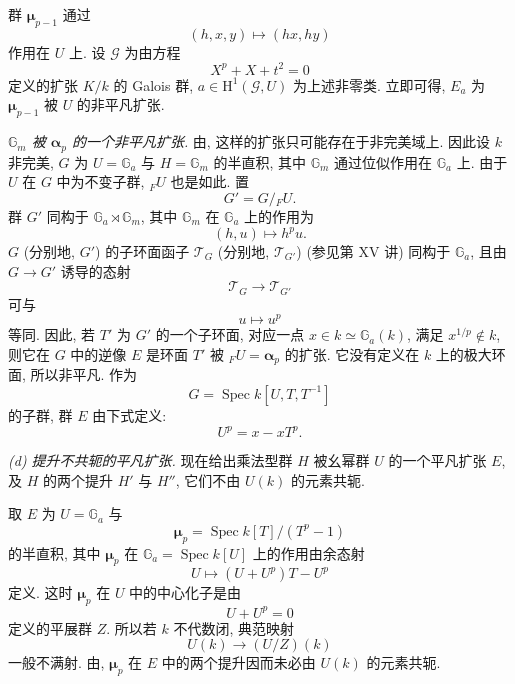 群 \(\boldsymbol\mu_{p-1}\) 通过
\[
  (h,x,y)\longmapsto(hx,hy)
\]
作用在 \(U\) 上. 设 \(\mathscr G\) 为由方程
\[
  X^p+X+t^2=0
\]
定义的扩张 \(K/k\) 的 Galois 群,
\(a\in\mathrm H^1(\mathscr G,U)\) 为上述非零类.
立即可得, \(E_a\) 为 \(\boldsymbol\mu_{p-1}\) 被 \(U\) 的非平凡扩张.

\smallskip
\noindent
\emph{
\(\mathbb G_m\) 被 \(\boldsymbol\alpha_p\) 的一个非平凡扩张.}
由,
这样的扩张只可能存在于非完美域上.
因此设 \(k\) 非完美, \(G\) 为 \(U=\mathbb G_a\) 与 \(H=\mathbb G_m\)
的半直积, 其中 \(\mathbb G_m\) 通过位似作用在 \(\mathbb G_a\) 上.
由于 \(U\) 在 \(G\) 中为不变子群, \({}_{F}U\) 也是如此. 置
\[
  G'=G/{}_{F}U.
\]
群 \(G'\) 同构于 \(\mathbb G_a\rtimes\mathbb G_m\),
其中 \(\mathbb G_m\) 在 \(\mathbb G_a\) 上的作用为
\[
  (h,u)\longmapsto h^p u.
\]
\(G\) (分别地, \(G'\)) 的子环面函子 \(\mathscr T_G\)
(分别地, \(\mathscr T_{G'}\)) (参见第 XV 讲) 同构于 \(\mathbb G_a\),
且由 \(G\longrightarrow G'\) 诱导的态射
\[
  \mathscr T_G\longrightarrow\mathscr T_{G'}
\]
可与
\[
  u\longmapsto u^p
\]
等同. 因此, 若 \(T'\) 为 \(G'\) 的一个子环面,
对应一点 \(x\in k\simeq\mathbb G_a(k)\), 满足 \(x^{1/p}\notin k\),
则它在 \(G\) 中的逆像 \(E\) 是环面 \(T'\) 被 \({}_{F}U=\boldsymbol\alpha_p\) 的扩张.
它没有定义在 \(k\) 上的极大环面, 所以非平凡.
作为
\[
  G=\operatorname{Spec}k[U,T,T^{-1}]
\]
的子群, 群 \(E\) 由下式定义:
\[
  U^p=x-xT^p.
\]


\smallskip
\noindent
\emph{(d) 提升不共轭的平凡扩张.}
现在给出乘法型群 \(H\) 被幺幂群 \(U\) 的一个平凡扩张 \(E\),
及 \(H\) 的两个提升 \(H'\) 与 \(H''\), 它们不由 \(U(k)\) 的元素共轭.

取 \(E\) 为 \(U=\mathbb G_a\) 与
\[
  \boldsymbol\mu_p
  =\operatorname{Spec}k[T]/(T^p-1)
\]
的半直积, 其中 \(\boldsymbol\mu_p\) 在 \(\mathbb G_a=\operatorname{Spec}k[U]\)
上的作用由余态射
\[
  U\longmapsto(U+U^p)T-U^p
\]
定义. 这时 \(\boldsymbol\mu_p\) 在 \(U\) 中的中心化子是由
\[
  U+U^p=0
\]
定义的平展群 \(Z\). 所以若 \(k\) 不代数闭, 典范映射
\[
  U(k)\longrightarrow(U/Z)(k)
\]
一般不满射.
由,
\(\boldsymbol\mu_p\) 在 \(E\) 中的两个提升因而未必由 \(U(k)\) 的元素共轭.

